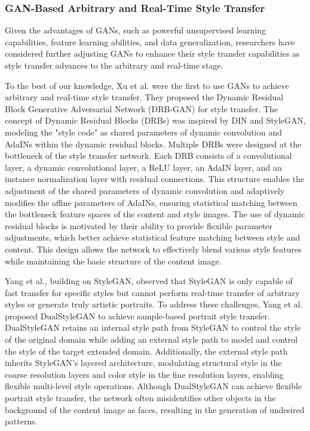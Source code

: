 \subsubsection{GAN-Based Arbitrary and Real-Time Style Transfer}

Given the advantages of GANs, such as powerful unsupervised learning capabilities, feature learning abilities, and data generalization, researchers have considered further adjusting GANs to enhance their style transfer capabilities as style transfer advances to the arbitrary and real-time stage.

To the best of our knowledge, Xu et al.\citep{44xu2021drb} were the first to use GANs to achieve arbitrary and real-time style transfer. They proposed the Dynamic Residual Block Generative Adversarial Network (DRB-GAN) for style transfer. The concept of Dynamic Residual Blocks (DRBs) was inspired by DIN and StyleGAN, modeling the "style code" as shared parameters of dynamic convolution and AdaINs within the dynamic residual blocks. Multiple DRBs were designed at the bottleneck of the style transfer network. Each DRB consists of a convolutional layer, a dynamic convolutional layer, a ReLU layer, an AdaIN layer, and an instance normalization layer with residual connections. This structure enables the adjustment of the shared parameters of dynamic convolution and adaptively modifies the affine parameters of AdaINs, ensuring statistical matching between the bottleneck feature spaces of the content and style images. The use of dynamic residual blocks is motivated by their ability to provide flexible parameter adjustments, which better achieve statistical feature matching between style and content. This design allows the network to effectively blend various style features while maintaining the basic structure of the content image.

Yang et al.\citep{45yang2022pastiche}, building on StyleGAN\citep{19karras2019style}, observed that StyleGAN is only capable of fast transfer for specific styles but cannot perform real-time transfer of arbitrary styles or generate truly artistic portraits. To address these challenges, Yang et al. proposed DualStyleGAN to achieve sample-based portrait style transfer. DualStyleGAN retains an internal style path from StyleGAN to control the style of the original domain while adding an external style path to model and control the style of the target extended domain. Additionally, the external style path inherits StyleGAN's layered architecture, modulating structural style in the coarse resolution layers and color style in the fine resolution layers, enabling flexible multi-level style operations. Although DualStyleGAN can achieve flexible portrait style transfer, the network often misidentifies other objects in the background of the content image as faces, resulting in the generation of undesired patterns.

